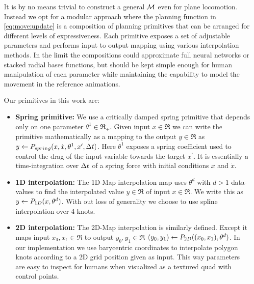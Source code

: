 It is by no means trivial to construct a general $\mathcal{M}$ even for plane locomotion. Instead we opt for a modular approach where the planning function in \eqref{eq:move:update} is a composition of planning primitives that can be arranged for different levels of expressiveness. Each primitive exposes a set of adjustable parameters and performs input to output mapping using various interpolation methods. In the limit the compositions could approximate full neural networks or stacked radial bases functions, but should be kept simple enough for human manipulation of each parameter while maintaining the capability to model the movement in the reference animations.     

Our primitives in this work are:

\begin{itemize}
\item{\bf Spring primitive:} We use a critically damped spring primitive that depends only on one parameter $\theta^1 \in \Re_+$. Given input $x \in \Re$ we can write the primitive mathematically as a mapping to the output $y \in \Re$ as $y \leftarrow P_{spring}{( x , \dot{x}, \theta^1, x^\prime, \Delta{t})}$. Here $\theta^1$ exposes a spring coefficient used to control the drag of the input variable towards the target $x^\prime$. It is essentially a time-integration over $\Delta{t}$ of a spring force with initial conditions $x$ and $\dot{x}$.

\item{\bf 1D interpolation:} The 1D-Map interpolation map uses $\theta^d$ with $d>1$ data-values to find the interpolated value $y \in \Re$ of input $x \in \Re$. We write this as  $y \leftarrow P_{1D}(x,\theta^{d})$. With out loss of generality we choose to use spline interpolation over 4 knots.

\item{\bf 2D interpolation:} The 2D-Map interpolation is similarly defined. Except it maps input $x_0,x_1 \in \Re$ to output $y_0,y_1 \in \Re$ $(y_0,y_1) \leftarrow P_{2D}( (x_0, x_1),\theta^{d})$. In our implementation we use barycentric coordinates to interpolate polygon knots according to a 2D grid position given as input. This way parameters are easy to inspect for humans when visualized as a textured quad with control points.   
\end{itemize}

